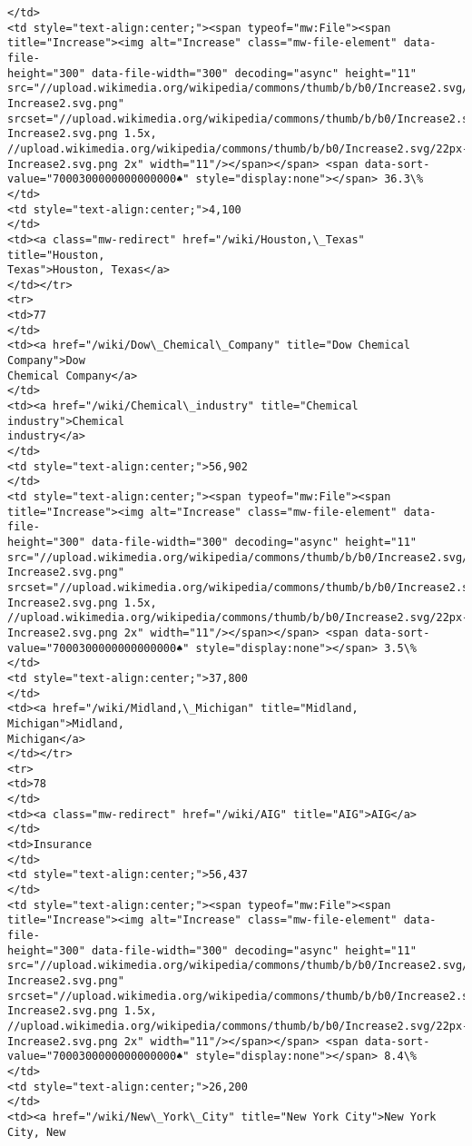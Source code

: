 \documentclass[11pt]{article}
\begin{document}
\begin{Verbatim}[commandchars=\\\{\}]
</td>
<td style="text-align:center;"><span typeof="mw:File"><span
title="Increase"><img alt="Increase" class="mw-file-element" data-file-
height="300" data-file-width="300" decoding="async" height="11"
src="//upload.wikimedia.org/wikipedia/commons/thumb/b/b0/Increase2.svg/11px-
Increase2.svg.png"
srcset="//upload.wikimedia.org/wikipedia/commons/thumb/b/b0/Increase2.svg/17px-
Increase2.svg.png 1.5x,
//upload.wikimedia.org/wikipedia/commons/thumb/b/b0/Increase2.svg/22px-
Increase2.svg.png 2x" width="11"/></span></span> <span data-sort-
value="7000300000000000000♠" style="display:none"></span> 36.3\%
</td>
<td style="text-align:center;">4,100
</td>
<td><a class="mw-redirect" href="/wiki/Houston,\_Texas" title="Houston,
Texas">Houston, Texas</a>
</td></tr>
<tr>
<td>77
</td>
<td><a href="/wiki/Dow\_Chemical\_Company" title="Dow Chemical Company">Dow
Chemical Company</a>
</td>
<td><a href="/wiki/Chemical\_industry" title="Chemical industry">Chemical
industry</a>
</td>
<td style="text-align:center;">56,902
</td>
<td style="text-align:center;"><span typeof="mw:File"><span
title="Increase"><img alt="Increase" class="mw-file-element" data-file-
height="300" data-file-width="300" decoding="async" height="11"
src="//upload.wikimedia.org/wikipedia/commons/thumb/b/b0/Increase2.svg/11px-
Increase2.svg.png"
srcset="//upload.wikimedia.org/wikipedia/commons/thumb/b/b0/Increase2.svg/17px-
Increase2.svg.png 1.5x,
//upload.wikimedia.org/wikipedia/commons/thumb/b/b0/Increase2.svg/22px-
Increase2.svg.png 2x" width="11"/></span></span> <span data-sort-
value="7000300000000000000♠" style="display:none"></span> 3.5\%
</td>
<td style="text-align:center;">37,800
</td>
<td><a href="/wiki/Midland,\_Michigan" title="Midland, Michigan">Midland,
Michigan</a>
</td></tr>
<tr>
<td>78
</td>
<td><a class="mw-redirect" href="/wiki/AIG" title="AIG">AIG</a>
</td>
<td>Insurance
</td>
<td style="text-align:center;">56,437
</td>
<td style="text-align:center;"><span typeof="mw:File"><span
title="Increase"><img alt="Increase" class="mw-file-element" data-file-
height="300" data-file-width="300" decoding="async" height="11"
src="//upload.wikimedia.org/wikipedia/commons/thumb/b/b0/Increase2.svg/11px-
Increase2.svg.png"
srcset="//upload.wikimedia.org/wikipedia/commons/thumb/b/b0/Increase2.svg/17px-
Increase2.svg.png 1.5x,
//upload.wikimedia.org/wikipedia/commons/thumb/b/b0/Increase2.svg/22px-
Increase2.svg.png 2x" width="11"/></span></span> <span data-sort-
value="7000300000000000000♠" style="display:none"></span> 8.4\%
</td>
<td style="text-align:center;">26,200
</td>
<td><a href="/wiki/New\_York\_City" title="New York City">New York City, New

\end{Verbatim}
\end{document}
